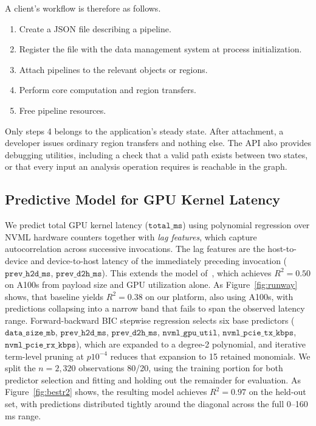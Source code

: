 A client's workflow is therefore as follows.

\begin{enumerate}
    \item Create a JSON file describing a pipeline.
    \item Register the file with the data management system at process initialization.
    \item Attach pipelines to the relevant objects or regions.
    \item Perform core computation and region transfers.
    \item Free pipeline resources.
\end{enumerate}

Only steps 4 belongs to the application's steady state. After attachment, a
developer issues ordinary region transfers and nothing else. The API also
provides debugging utilities, including a check that a valid path exists
between two states, or that every input an analysis operation requires is
reachable in the graph.

\subsection{Predictive Model for GPU Kernel Latency}
\label{sec:model}

We predict total GPU kernel latency ($\texttt{total\_ms}$) using polynomial
regression over NVML hardware counters together with \emph{lag features},
which capture autocorrelation across successive invocations. The lag
features are the host-to-device and device-to-host latency of the
immediately preceding invocation ($\texttt{prev\_h2d\_ms}$,
$\texttt{prev\_d2h\_ms}$). This extends the model
of~\cite{ravi2023runway}, which achieves $R^2 = 0.50$ on A100s from payload
size and GPU utilization alone. As Figure~\ref{fig:runway} shows, that
baseline yields $R^2 = 0.38$ on our platform, also using A100s, with
predictions collapsing into a narrow band that fails to span the observed
latency range. Forward-backward BIC stepwise regression selects six base
predictors ($\texttt{data\_size\_mb}$, $\texttt{prev\_h2d\_ms}$,
$\texttt{prev\_d2h\_ms}$, $\texttt{nvml\_gpu\_util}$,
$\texttt{nvml\_pcie\_tx\_kbps}$, $\texttt{nvml\_pcie\_rx\_kbps}$), which are
expanded to a degree-2 polynomial, and iterative term-level pruning at $p 
10^{-4}$ reduces that expansion to 15 retained monomials. We split the $n =
2{,}320$ observations 80/20, using the training portion for both predictor
selection and fitting and holding out the remainder for evaluation. As
Figure~\ref{fig:bestr2} shows, the resulting model achieves $R^2 = 0.97$ on
the held-out set, with predictions distributed tightly around the diagonal
across the full 0--160\,ms range.

